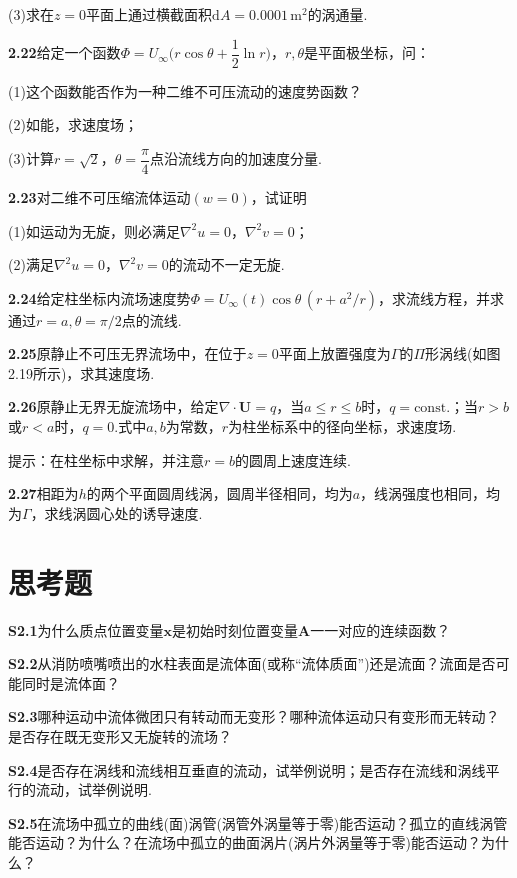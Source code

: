 (3)求在$z=0$平面上通过横截面积$\mathrm{d}A=0.0001\,\mathrm{m^2}$的涡通量.

\medskip
\noindent\textbf{2.22}\quad 给定一个函数$\Phi=U_\infty\Big(r\cos\theta+\dfrac{1}{2}\ln r\Big)$，$r,\theta$是平面极坐标，问：

(1)这个函数能否作为一种二维不可压流动的速度势函数？

(2)如能，求速度场；

(3)计算$r=\sqrt{2}$，$\theta=\dfrac{\pi}{4}$点沿流线方向的加速度分量.

\medskip
\noindent\textbf{2.23}\quad 对二维不可压缩流体运动$(w=0)$，试证明

(1)如运动为无旋，则必满足$\nabla^{2}u=0$，$\nabla^{2}v=0$；

(2)满足$\nabla^{2}u=0$，$\nabla^{2}v=0$的流动不一定无旋.

\medskip
\noindent\textbf{2.24}\quad 给定柱坐标内流场速度势$\Phi=U_\infty(t)\cos\theta\,(r+a^{2}/r)$，求流线方程，并求通过$r=a,\theta=\pi/2$点的流线.

\medskip
\noindent\textbf{2.25}\quad 原静止不可压无界流场中，在位于$z=0$平面上放置强度为$\Gamma$的$\Pi$形涡线(如图2.19所示)，求其速度场.

\medskip
\noindent\textbf{2.26}\quad 原静止无界无旋流场中，给定$\nabla\cdot\boldsymbol{U}=q$，当$a\leqslant r\leqslant b$时，$q=\mathrm{const.}$；当$r>b$或$r<a$时，$q=0$.式中$a,b$为常数，$r$为柱坐标系中的径向坐标，求速度场.

提示：在柱坐标中求解，并注意$r=b$的圆周上速度连续.

\medskip
\noindent\textbf{2.27}\quad 相距为$h$的两个平面圆周线涡，圆周半径相同，均为$a$，线涡强度也相同，均为$\Gamma$，求线涡圆心处的诱导速度.

\section*{思考题}

\noindent\textbf{S2.1}\quad 为什么质点位置变量$\boldsymbol{x}$是初始时刻位置变量$\boldsymbol{A}$一一对应的连续函数？

\medskip
\noindent\textbf{S2.2}\quad 从消防喷嘴喷出的水柱表面是流体面(或称“流体质面”)还是流面？流面是否可能同时是流体面？

\medskip
\noindent\textbf{S2.3}\quad 哪种运动中流体微团只有转动而无变形？哪种流体运动只有变形而无转动？是否存在既无变形又无旋转的流场？

\medskip
\noindent\textbf{S2.4}\quad 是否存在涡线和流线相互垂直的流动，试举例说明；是否存在流线和涡线平行的流动，试举例说明.

\medskip
\noindent\textbf{S2.5}\quad 在流场中孤立的曲线(面)涡管(涡管外涡量等于零)能否运动？孤立的直线涡管能否运动？为什么？在流场中孤立的曲面涡片(涡片外涡量等于零)能否运动？为什么？
